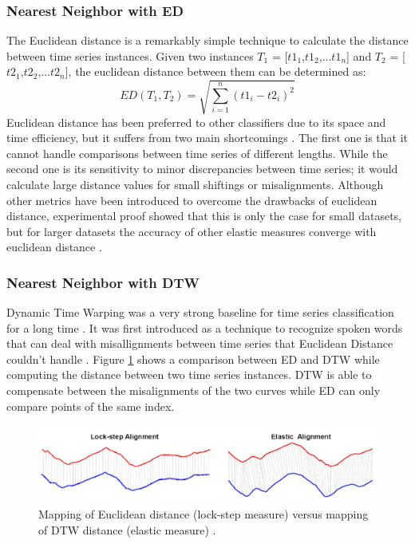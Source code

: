 \subsubsection{Nearest Neighbor with ED}
The Euclidean distance is a remarkably simple technique to calculate the distance between time series instances.
Given two instances  $T_{1}$ = [$t1_{1}$,$t1_{2}$,...$t1_{n}$]
and $T_{2}$ = [$t2_{1}$,$t2_{2}$,...$t2_{n}$], the euclidean distance
between them can be determined as:
\begin{equation}
    ED(T_{1},T_{2})= \sqrt{\sum_{i=1}^{n} (t1_{i} - t2_{i})^{2}}
\end{equation}
Euclidean distance has been preferred to other classifiers due to its space and time efficiency, but it suffers from two main shortcomings \cite{baydogan2013bag, jeong2011weighted,kate2016using}.
The first one is that it cannot handle comparisons between time series of different lengths.
While the second one is its sensitivity to minor discrepancies between time series; it would calculate large distance values for small shiftings or misalignments.
Although other metrics have been introduced to overcome the drawbacks of euclidean distance,
experimental proof showed that this is only the case for small datasets, but for larger datasets the accuracy of other elastic measures
converge with euclidean distance \cite{hills2014classification,ding2008querying,bagnall2012transformation}.


\subsubsection{Nearest Neighbor with DTW}
\label{SubsubsectionDTW}
Dynamic Time Warping was a very strong baseline for time series classification for a long time \cite{abanda2019review,bagnall2017great}.
It was first introduced as a technique to recognize spoken words that can deal with misallignments between time series
that Euclidean Distance couldn't handle \cite{tan2020fastee}.
Figure \ref{Img:ED_vs_DTW} shows a comparison between ED and DTW while computing the distance between two time series instances.
DTW is able to compensate between the misalignments of the two curves while ED can only compare points of the same index.

\begin{figure}[!htbp]
    \captionsetup{justification=raggedright}
    \centering
    \includegraphics[scale = 0.5]{ED_vs_DTW.JPG}
    \centering
    \caption{Mapping of Euclidean distance (lock-step measure) versus mapping of DTW distance (elastic measure) \cite{abanda2019review}.}
    \label{Img:ED_vs_DTW}
\end{figure}

